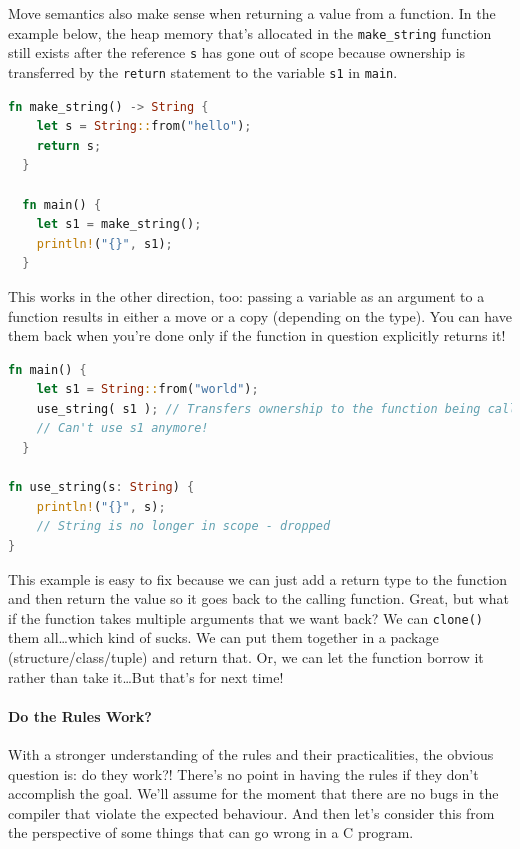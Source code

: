 Move semantics also make sense when returning a value from a function. In the example below, the heap memory that's allocated in the \texttt{make\_string} function still exists after the reference \texttt{s} has gone out of scope because ownership is transferred by the \texttt{return} statement to the variable \texttt{s1} in \texttt{main}.

\begin{lstlisting}[language=Rust]
  fn make_string() -> String {
    let s = String::from("hello");
    return s;
  }

  fn main() {
    let s1 = make_string();
    println!("{}", s1);
  }
\end{lstlisting}

This works in the other direction, too: passing a variable as an argument to a function results in either a move or a copy (depending on the type). You can have them back when you're done only if the function in question explicitly returns it! 

\begin{lstlisting}[language=Rust]
  fn main() {
    let s1 = String::from("world");
	use_string( s1 ); // Transfers ownership to the function being called
	// Can't use s1 anymore!
  }
  
fn use_string(s: String) {
    println!("{}", s); 
    // String is no longer in scope - dropped
}
\end{lstlisting}

This example is easy to fix because we can just add a return type to the function and then return the value so it goes back to the calling function. Great, but what if the function takes multiple arguments that we want back? We can \texttt{clone()} them all\ldots which kind of sucks. We can put them together in a package (structure/class/tuple) and return that. Or, we can let the function borrow it rather than take it\ldots But that's for next time!

\paragraph{Do the Rules Work?}
With a stronger understanding of the rules and their practicalities, the obvious question is: do they work?! There's no point in having the rules if they don't accomplish the goal. We'll assume for the moment that there are no bugs in the compiler that violate the expected behaviour. And then let's consider this from the perspective of some things that can go wrong in a C program.


